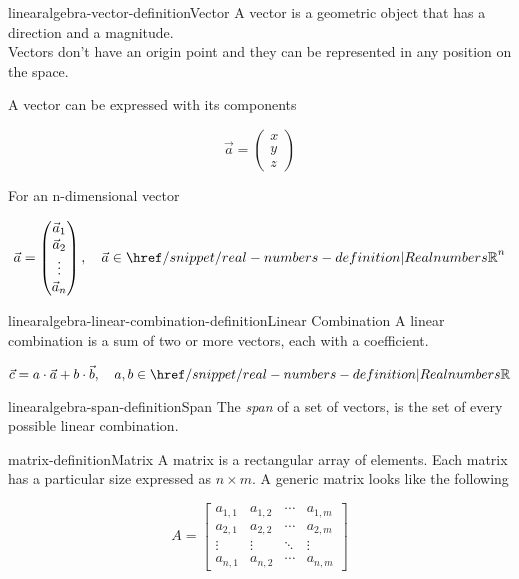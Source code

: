 \documentclass[preview]{standalone}
\begin{document}

\begin{snippetdefinition}{linearalgebra-vector-definition}{Vector}
    A vector is a geometric object that has a direction and a magnitude. \\
    Vectors don't have an origin point and they can be represented in any position on the space.

    A vector can be expressed with its components

    \[
        \vec{a} =
        \begin{pmatrix}
            x \\
            y \\
            z
        \end{pmatrix}
    \]

    For an n-dimensional vector

    \[
        \vec{a} =
        \begin{pmatrix}
            \vec{a}_1 \\
            \vec{a}_2 \\
            \vdots \\
            \vec{a}_n
        \end{pmatrix},
        \quad \vec{a} \in {\realnumbers}^n
    \]
\end{snippetdefinition}

\begin{snippetdefinition}{linearalgebra-linear-combination-definition}{Linear Combination}
    A linear combination is a sum of two or more vectors, each with a coefficient.

    \[
        \vec{c} = a \cdot\vec{a} + b\cdot\vec{b},
        \quad a,b\in \realnumbers
    \]
\end{snippetdefinition}

\begin{snippetdefinition}{linearalgebra-span-definition}{Span}
    The \textit{span} of a set of vectors, is the set of every possible linear combination.
\end{snippetdefinition}

\begin{snippetdefinition}{matrix-definition}{Matrix}
    A matrix is a rectangular array of elements.
    Each matrix has a particular size expressed as \(n \times m\).
    A generic matrix looks like the following

    \[
    A = \begin{bmatrix} 
            a_{1,1} & a_{1,2} & \cdots & a_{1,m} \\
            a_{2,1} & a_{2,2} & \cdots & a_{2,m} \\
            \vdots  & \vdots  & \ddots & \vdots  \\
            a_{n,1} & a_{n,2} & \cdots & a_{n,m} 
        \end{bmatrix}
    \]
\end{snippetdefinition}
\end{document}
